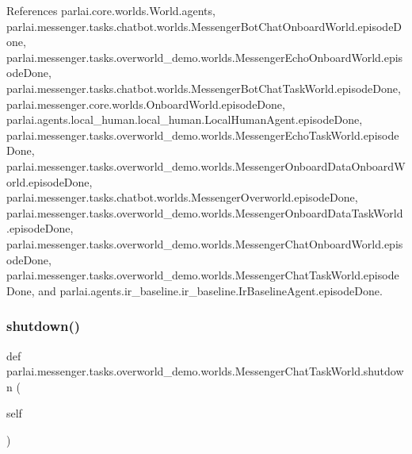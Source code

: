 References parlai.\+core.\+worlds.\+World.\+agents, parlai.\+messenger.\+tasks.\+chatbot.\+worlds.\+Messenger\+Bot\+Chat\+Onboard\+World.\+episode\+Done, parlai.\+messenger.\+tasks.\+overworld\+\_\+demo.\+worlds.\+Messenger\+Echo\+Onboard\+World.\+episode\+Done, parlai.\+messenger.\+tasks.\+chatbot.\+worlds.\+Messenger\+Bot\+Chat\+Task\+World.\+episode\+Done, parlai.\+messenger.\+core.\+worlds.\+Onboard\+World.\+episode\+Done, parlai.\+agents.\+local\+\_\+human.\+local\+\_\+human.\+Local\+Human\+Agent.\+episode\+Done, parlai.\+messenger.\+tasks.\+overworld\+\_\+demo.\+worlds.\+Messenger\+Echo\+Task\+World.\+episode\+Done, parlai.\+messenger.\+tasks.\+overworld\+\_\+demo.\+worlds.\+Messenger\+Onboard\+Data\+Onboard\+World.\+episode\+Done, parlai.\+messenger.\+tasks.\+chatbot.\+worlds.\+Messenger\+Overworld.\+episode\+Done, parlai.\+messenger.\+tasks.\+overworld\+\_\+demo.\+worlds.\+Messenger\+Onboard\+Data\+Task\+World.\+episode\+Done, parlai.\+messenger.\+tasks.\+overworld\+\_\+demo.\+worlds.\+Messenger\+Chat\+Onboard\+World.\+episode\+Done, parlai.\+messenger.\+tasks.\+overworld\+\_\+demo.\+worlds.\+Messenger\+Chat\+Task\+World.\+episode\+Done, and parlai.\+agents.\+ir\+\_\+baseline.\+ir\+\_\+baseline.\+Ir\+Baseline\+Agent.\+episode\+Done.

\mbox{\label{classparlai_1_1messenger_1_1tasks_1_1overworld__demo_1_1worlds_1_1MessengerChatTaskWorld_ae74306ebc133821d89b295315fbff382}} 
\subsubsection{\texorpdfstring{shutdown()}{shutdown()}}
{\footnotesize\ttfamily def parlai.\+messenger.\+tasks.\+overworld\+\_\+demo.\+worlds.\+Messenger\+Chat\+Task\+World.\+shutdown (\begin{DoxyParamCaption}\item[{}]{self }\end{DoxyParamCaption})}



